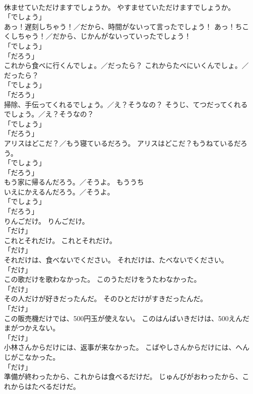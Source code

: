 \documentclass[8pt]{extreport}
\begin{document}
\begin{CJK}{UTF8}{min}
\\	休ませていただけますでしょうか。	やすませていただけますでしょうか。	
\\	「でしょう」 
\\	あっ！遅刻しちゃう！／だから、時間がないって言ったでしょう！	あっ！ちこくしちゃう！／だから、じかんがないっていったでしょう！	
\\	「でしょう」 
\\	「だろう」 
\\	これから食べに行くんでしょ。／だったら？	これからたべにいくんでしょ。／だったら？	
\\	「でしょう」 
\\	「だろう」 
\\	掃除、手伝ってくれるでしょう。／え？そうなの？	そうじ、てつだってくれるでしょう。／え？そうなの？	
\\	「でしょう」 
\\	「だろう」 
\\	アリスはどこだ？／もう寝ているだろう。	アリスはどこだ？もうねているだろう。	
\\	「でしょう」 
\\	「だろう」 
\\	もう家に帰るんだろう。／そうよ。	もう{うち
\\	いえ}にかえるんだろう。／そうよ。	
\\	「でしょう」 
\\	「だろう」 
\\	りんごだけ。	りんごだけ。	
\\	「だけ」	
\\	これとそれだけ。	これとそれだけ。	
\\	「だけ」	
\\	それだけは、食べないでください。	それだけは、たべないでください。	
\\	「だけ」	
\\	この歌だけを歌わなかった。	このうただけをうたわなかった。	
\\	「だけ」	
\\	その人だけが好きだったんだ。	そのひとだけがすきだったんだ。	
\\	「だけ」	
\\	この販売機だけでは、500円玉が使えない。	このはんばいきだけは、500えんだまがつかえない。	
\\	「だけ」	
\\	小林さんからだけには、返事が来なかった。	こばやしさんからだけには、へんじがこなかった。	
\\	「だけ」	
\\	準備が終わったから、これからは食べるだけだ。	じゅんびがおわったから、これからはたべるだけだ。	

\end{CJK}
\end{document}
